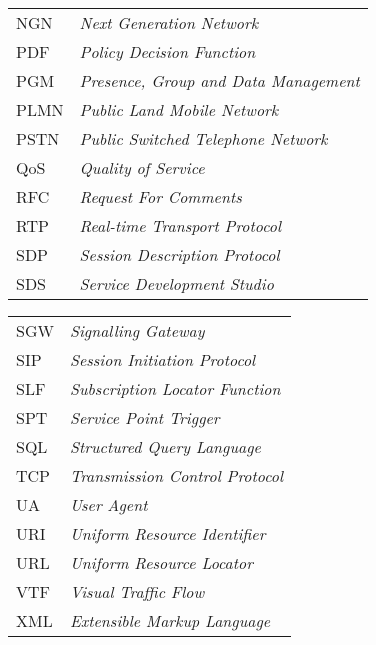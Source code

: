 \begin{tabular}{p{2cm}l}
NGN & \emph{Next Generation Network} \\
PDF & \emph{Policy Decision Function} \\
PGM & \emph{Presence, Group and Data Management} \\
PLMN & \emph{Public Land Mobile Network} \\
PSTN & \emph{Public Switched Telephone Network} \\
QoS & \emph{Quality of Service} \\
RFC & \emph{Request For Comments} \\
RTP & \emph{Real-time Transport Protocol} \\
SDP & \emph{Session Description Protocol} \\
SDS & \emph{Service Development Studio} \\
\end{tabular}

\begin{tabular}{p{2cm}l}
SGW & \emph{Signalling Gateway} \\
SIP & \emph{Session Initiation Protocol} \\
SLF & \emph{Subscription Locator Function} \\
SPT & \emph{Service Point Trigger} \\
SQL & \emph{Structured Query Language} \\
TCP & \emph{Transmission Control Protocol} \\
UA & \emph{User Agent} \\
URI & \emph{Uniform Resource Identifier} \\
URL & \emph{Uniform Resource Locator} \\
VTF & \emph{Visual Traffic Flow} \\
XML & \emph{Extensible Markup Language} \\
\end{tabular}
